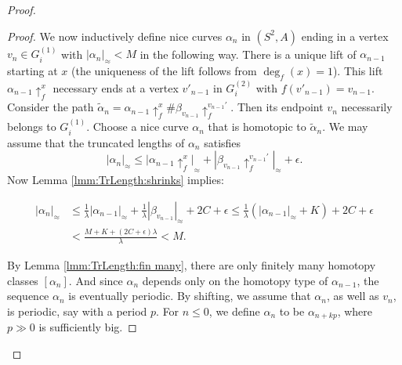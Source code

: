 \documentclass{amsart}
\theoremstyle{plain}
\theoremstyle{definition}
\theoremstyle{remark}
\newcommand{\reminder}[1]{\textsl{$\lhd\rhd$#1$\lhd\rhd$}\marginpar{$\lhd\rhd\lhd\rhd\lhd\rhd$}}%
\newcommand{\hide}[1]{}
\newcommand\lift[2]{{\uparrow}_{#1}^{#2}}
\begin{document}
\begin{proof}
\begin{proof}
We now inductively define nice curves $\alpha_n$ in $(S^2,A)$ ending in a vertex $v_n\in G_i^{(1)}$ with $|\alpha_n|_\approx < M$ in the following way.  There is a unique lift of $\alpha_{n-1}$ starting at $x$ (the uniqueness of the lift follows from $\deg_f(x)=1$).  This lift $\alpha_{n-1} \lift{f}{x}$ necessary ends at a vertex $v'_{n-1}$ in $G_i^{(2)}$ with $f(v'_{n-1})=v_{n-1}$.  Consider the path $\widetilde \alpha_n=\alpha_{n-1} \lift{f}{x} \# \beta_{v_{n-1}} \lift{f}{v_{n-1}'}$. Then its endpoint $v_n$ necessarily belongs to $G_i^{(1)}$. Choose a nice curve $\alpha_{n}$ that is homotopic to $\widetilde \alpha_n$.
We may assume that the truncated lengths of $ \alpha_{n}$ satisfies 
\[
| \alpha_{n}|_\approx \leq |\alpha_{n-1} \lift{f}{x}|_\approx + |\beta_{v_{n-1}} \lift{f}{v_{n-1}'}|_\approx+\epsilon.
\] 
Now Lemma \ref{lmm:TrLength:shrinks} implies:

\begin{align*}
 | \alpha_{n}|_{\approx} &\leq\frac{1}{\lambda} | \alpha_{n-1}|_{\approx} + \frac{1}{\lambda} | \beta_{v_{n-1}}|_{\approx} + 2C+\epsilon \leq \frac{1}{\lambda} (| \alpha_{n-1}|_{\approx} + K) + 2C+\epsilon \\& < \frac{M+K+ (2C+\epsilon)\lambda}{\lambda} < M.
\end{align*}
 
%



By Lemma \ref{lmm:TrLength:fin many},  there are only finitely many homotopy classes $[\alpha_n]$.  And since   $\alpha_n$ depends only on the homotopy type of $\alpha_{n-1}$, the sequence $\alpha_n$ is eventually periodic.  By shifting, we assume that $\alpha_n$, as well as $v_n$,  is periodic, say with a period $p$. For $n\le 0$, we define $\alpha_{n}$ to be $\alpha_{n+kp}$, where $p\gg 0$ is sufficiently big.



\end{proof}
\end{proof}
\end{document}
